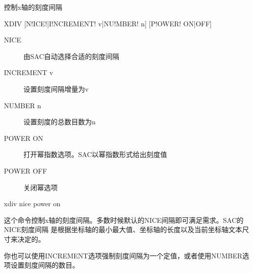 \label{cmd:xdiv}

控制x轴的刻度间隔

\begin{SACSTX}
XDIV [N!ICE!|I!NCREMENT! v|NU!MBER! n] [P!OWER! ON|OFF]
\end{SACSTX}

\begin{description}
\item [NICE] 由SAC自动选择合适的刻度间隔
\item [INCREMENT v] 设置刻度间隔增量为v
\item [NUMBER n] 设置刻度的总数目数为n  
\item [POWER ON] 打开幂指数选项。SAC以幂指数形式给出刻度值
\item [POWER OFF] 关闭幂选项 
\end{description}

\begin{SACDFT}
xdiv nice power on
\end{SACDFT}

这个命令控制x轴的刻度间隔。多数时候默认的NICE间隔即可满足需求。SAC的NICE刻度间隔
是根据坐标轴的最小最大值、坐标轴的长度以及当前坐标轴文本尺寸来决定的。

你也可以使用INCREMENT选项强制刻度间隔为一个定值，或者使用NUMBER选项设置刻度间隔的数目。

